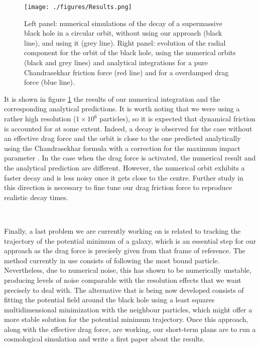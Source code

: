 \documentclass[a4,useAMS,usenatbib,usegraphicx,12pt]{article}
\begin{document}
\begin{figure}[!htbp]
\centering

  \texttt{[image: ./figures/Results.png]}
  
  \caption{\small Left panel: numerical simulations of the decay of a 
  supermassive black hole in a circular orbit, without using our approach
  (black line), and using it (grey line). Right panel: evolution of the
  radial component for the orbit of the black hole, using the numerical
  orbits (black and grey lines) and analytical integrations for a pure
  Chandrasekhar friction force (red line) and for a overdamped drag force
  (blue line).}

  \label{fig:dynamical_friction}

\end{figure}


It is shown in figure \ref{fig:dynamical_friction} the results of our numerical
integration and the corresponding analytical predictions. It is worth noting 
that we were using a rather high resolution ($1\times 10^6$ particles), so it 
is expected that dynamical friction is accounted for at some extent. Indeed, a 
decay is observed for the case without an effective drag force and the orbit 
is close to the one predicted analytically using the Chandrasekhar formula with 
a correction for the maximum impact parameter \citep{Just2011}. In the case 
when the drag force is activated, the numerical result and the analytical 
prediction are different. However, the numerical orbit exhibits a faster decay 
and is less noisy once it gets close to the centre. Further study in this direction 
is necessary to fine tune our drag friction force to reproduce realistic decay 
times.

\

Finally, a last problem we are currently working on is related to tracking 
the trajectory of the potential minimum of a galaxy, which is an essential step 
for our approach as the drag force is precisely given from that frame of 
reference. The method currently in use consists of following the most bound 
particle. Nevertheless, due to numerical noise, this has shown to be numerically 
unstable, producing levels of noise comparable with the resolution effects that 
we want precisely to deal with. The alternative that is being now developed 
consists of fitting the potential field around the black hole using a least 
squares multidimensional minimization with the neighbour particles, which might
offer a more stable solution for the potential minimum trajectory. Once this
approach, along with the effective drag force, are working, our short-term plans 
are to run a cosmological simulation and write a first paper about the results.
\end{document}

